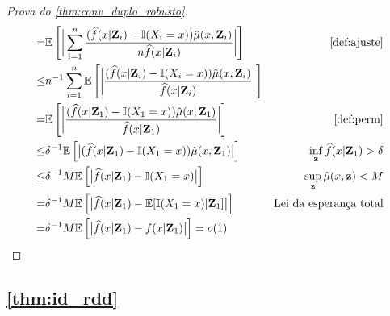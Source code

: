 \begin{proof}[Prova do \cref{thm:conv_duplo_robusto}]
\begin{align*}
  =& \E\left[\bigg|\sum_{i=1}^n 
  \frac{(\hf(x|\Z_i)-\I(X_i=x))
  \hat{\mu}(x,\Z_i)}
  {n\hf(x|\Z_i)}\bigg|\right]
  & \text{\cref{def:ajuste}} \\
  \leq& n^{-1}\sum_{i=1}^n\E\left[\bigg| 
  \frac{(\hf(x|\Z_i)-\I(X_i=x))
  \hat{\mu}(x,\Z_i)}
  {\hf(x|\Z_i)}\bigg|\right] \\
  =& \E\left[\bigg| 
  \frac{(\hf(x|\Z_1)-\I(X_1=x))
  \hat{\mu}(x,\Z_1)}
  {\hf(x|\Z_1)}\bigg|\right] 
  & \text{\cref{def:perm}} \\
  \leq& \delta^{-1} \E\left[\big| 
  (\hf(x|\Z_1)-\I(X_1=x))
  \hat{\mu}(x,\Z_1)\big|\right] 
  & \inf_\z \hf(x|\Z_1) > \delta \\
  \leq& \delta^{-1}M \E\left[\big| 
  \hf(x|\Z_1)-\I(X_1=x)\big|\right] 
  & \sup_\z \hat{\mu}(x,\z) < M \\
  =& \delta^{-1}M \E\left[\big| 
  \hf(x|\Z_1)-\E[\I(X_1=x)|\Z_1]\big|\right] 
  & \text{Lei da esperança total} \\
  =& \delta^{-1}M \E\left[\big| 
  \hf(x|\Z_1)-f(x|\Z_1)\big|\right]
  = o(1)
 \end{align*}
\end{proof}

\subsection{\cref{thm:id_rdd}}

